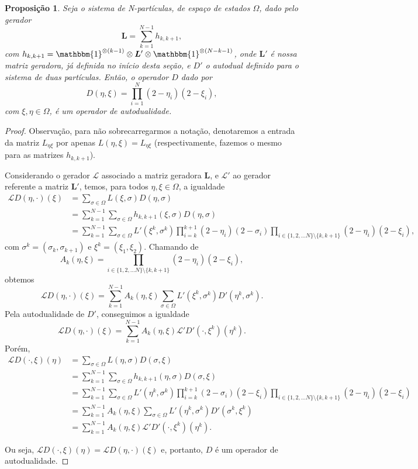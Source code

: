 \documentclass[twoside,openright,titlepage,numbers=noenddot,headinclude,  lineheaders footinclude=true,cleardoublepage=empty,
                                BCOR=5mm,paper=a4,fontsize=12pt ]{scrbook}
\newtheorem{prop}[teo]{Proposição}
\theoremstyle{definition}
\begin{document}
\begin{prop}
Seja o sistema de N-partículas, de espaço de estados $\Omega$, dado pelo gerador
\[
\bm{L} = \sum_{k=1}^{N-1} h_{k,k+1},
\]
com $h_{k,k+1} = \mathbbm{1}^{\otimes(k-1)}\otimes \bm{L}' \otimes \mathbbm{1}^{\otimes (N-k-1)}$, onde
$\bm{L}'$ é nossa matriz geradora, já definida no início desta seção, e $D'$  o autodual
definido para o sistema de duas partículas.
Então, o operador $D$ dado por
\[
D(\eta, \xi) = \prod_{i=1}^N (2 - \eta_i) (2 - \xi_i),
\]
com $\xi, \eta \in \Omega$, é um operador de autodualidade.
\end{prop}

\begin{proof}
Observação, para não sobrecarregarmos a notação,  denotaremos a entrada da matriz 
$L_{\eta \xi}$ por apenas $L(\eta, \xi) = L_{\eta \xi}$ (respectivamente, fazemos o mesmo para as matrizes $h_{k, k+1}$).

Considerando o gerador $\mathscr{L}$ associado a matriz geradora $\bm{L}$,
e $\mathscr{L}'$ ao gerador referente a matriz $\bm{L}'$,  temos,
para todos $\eta, \xi \in \Omega$, a igualdade
\begin{align*}
\mathscr{L}D(\eta, \cdot)(\xi) &= \sum_{\sigma \in \Omega} L(\xi, \sigma) D(\eta, \sigma)\\
						  &= \sum_{k=1}^{N-1} \sum_{\sigma \in \Omega} h_{k,k+1}(\xi, \sigma) D(\eta, \sigma)\\
						  &= \sum_{k=1}^{N-1} \sum_{\sigma \in \Omega} L'(\xi^k, \sigma^k) \prod_{i=k}^{k+1} (2-\eta_i)(2- \sigma_i) 
						     \prod_{i \in \{1,2,\ldots N\}\setminus\{k,k+1\}} (2-\eta_i)(2- \xi_i),
\end{align*}
com $\sigma^k = (\sigma_k, \sigma_{k+1})$ e $\xi^k = (\xi_1, \xi_2)$.
Chamando de 
\[A_k(\eta, \xi) = \prod_{i \in \{1,2,\ldots N\}\setminus\{k,k+1\}} (2-\eta_i)(2- \xi_i),\]
obtemos
\[
\mathscr{L}D(\eta, \cdot)(\xi)= \sum_{k=1}^{N-1} A_k(\eta, \xi) \sum_{\sigma \in \Omega} L'(\xi^k, \sigma^k)D'(\eta^k, \sigma^k).
\]
Pela autodualidade de $D'$, conseguimos a igualdade
\[
\mathscr{L}D(\eta, \cdot)(\xi)= \sum_{k=1}^{N-1} A_k(\eta, \xi) \mathscr{L}'D'(\cdot, \xi^k)(\eta^k).
\]
Porém,
\begin{align*}
\mathscr{L}D(\cdot, \xi)(\eta) &= \sum_{\sigma \in \Omega} L(\eta, \sigma) D(\sigma, \xi)\\
						  &= \sum_{k=1}^{N-1} \sum_{\sigma \in \Omega} h_{k,k+1}(\eta, \sigma) D(\sigma, \xi)\\
						  &= \sum_{k=1}^{N-1} \sum_{\sigma \in \Omega} L'(\eta^k, \sigma^k) \prod_{i=k}^{k+1} (2-\sigma_i)(2-\xi_i) 
						     \prod_{i \in \{1,2,\ldots N\}\setminus\{k,k+1\}} (2-\eta_i)(2-\xi_i)\\
						  &= \sum_{k=1}^{N-1} A_k(\eta, \xi) \sum_{\sigma \in \Omega} L'(\eta^k, \sigma^k) D'(\sigma^k, \xi^k) \\
						  &= \sum_{k=1}^{N-1} A_k(\eta, \xi) \mathscr{L}'D'(\cdot, \xi^k)(\eta^k).
\end{align*}

Ou seja, 
$\mathscr{L}D(\cdot, \xi)(\eta)  = \mathscr{L}D(\eta, \cdot)(\xi)$ e, portanto, $D$ é um operador
de autodualidade.
\end{proof}
\end{document}
